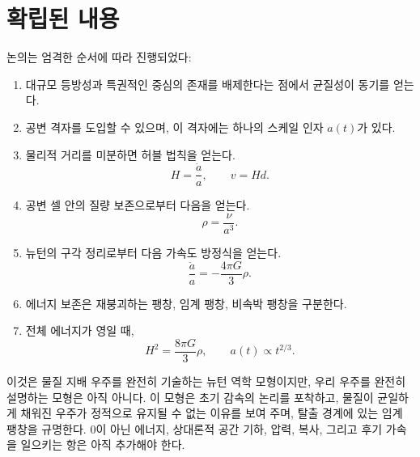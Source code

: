 \begin{classroomqa}
\end{classroomqa}

\section{확립된 내용}

논의는 엄격한 순서에 따라 진행되었다:
\begin{enumerate}
\item 대규모 등방성과 특권적인 중심의 존재를 배제한다는 점에서 균질성이 동기를 얻는다.
\item 공변 격자를 도입할 수 있으며, 이 격자에는 하나의 스케일 인자 \(a(t)\)가 있다.
\item 물리적 거리를 미분하면 허블 법칙을 얻는다.
  \[
  H=\frac{\dot a}{a},
  \qquad
  v=Hd.
  \]
\item 공변 셀 안의 질량 보존으로부터 다음을 얻는다.
  \[
  \rho=\frac{\nu}{a^3}.
  \]
\item 뉴턴의 구각 정리로부터 다음 가속도 방정식을 얻는다.
  \[
  \frac{\ddot a}{a}=-\frac{4\pi G}{3}\rho.
  \]
\item 에너지 보존은 재붕괴하는 팽창, 임계 팽창, 비속박 팽창을 구분한다.
\item 전체 에너지가 영일 때,
  \[
  H^2=\frac{8\pi G}{3}\rho,
  \qquad
  a(t)\propto t^{2/3}.
  \]
\end{enumerate}

이것은 물질 지배 우주를 완전히 기술하는 뉴턴 역학 모형이지만, 우리 우주를 완전히 설명하는 모형은 아직 아니다. 이 모형은 초기 감속의 논리를 포착하고, 물질이 균일하게 채워진 우주가 정적으로 유지될 수 없는 이유를 보여 주며, 탈출 경계에 있는 임계 팽창을 규명한다. 0이 아닌 에너지, 상대론적 공간 기하, 압력, 복사, 그리고 후기 가속을 일으키는 항은 아직 추가해야 한다.
